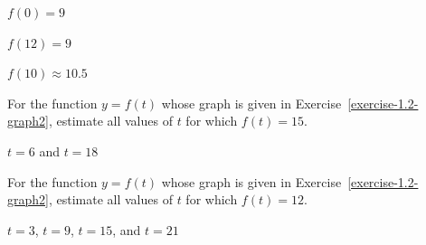 \begin{solution}
    \begin{parts}
        \item $f(0)=9$
        \item $f(12)=9$
        \item $f(10)\approx 10.5$
    \end{parts}
\end{solution}







\begin{exercise}
For the function $y = f(t)$ whose graph is given in Exercise~\ref{exercise-1.2-graph2}, estimate all values of $t$ for which $f(t) = 15$.
\end{exercise}



\begin{solution}
$t=6$ and $t=18$
\end{solution}







\begin{exercise}
For the function $y = f(t)$ whose graph is given in Exercise~\ref{exercise-1.2-graph2}, estimate all values of $t$ for which $f(t) = 12$.
\end{exercise}


\begin{solution}
$t=3$, $t=9$, $t=15$, and $t=21$
\end{solution}








